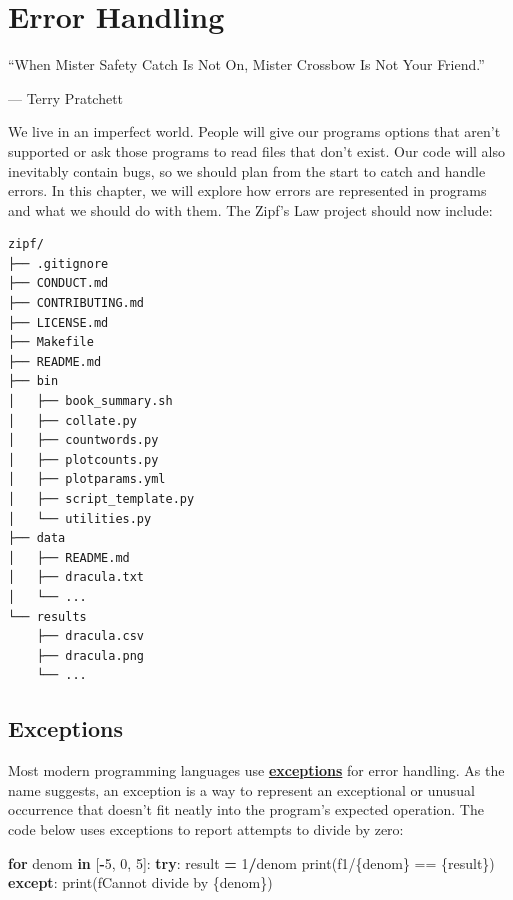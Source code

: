 \documentclass[
]{krantz}
\makeatletter
\newenvironment{Shaded}{\begin{snugshade}}{\end{snugshade}}
\newcommand{\BuiltInTok}[1]{#1}
\newcommand{\ControlFlowTok}[1]{\textcolor[rgb]{0.13,0.29,0.53}{\textbf{#1}}}
\newcommand{\DecValTok}[1]{\textcolor[rgb]{0.00,0.00,0.81}{#1}}
\newcommand{\KeywordTok}[1]{\textcolor[rgb]{0.13,0.29,0.53}{\textbf{#1}}}
\newcommand{\NormalTok}[1]{#1}
\newcommand{\OperatorTok}[1]{\textcolor[rgb]{0.81,0.36,0.00}{\textbf{#1}}}
\newcommand{\SpecialCharTok}[1]{\textcolor[rgb]{0.00,0.00,0.00}{#1}}
\newcommand{\SpecialStringTok}[1]{\textcolor[rgb]{0.31,0.60,0.02}{#1}}
\renewenvironment{quote}{\begin{VF}}{\end{VF}}
\newenvironment{kframe}{%
\medskip{}
\setlength{\fboxsep}{.8em}
 \def\at@end@of@kframe{}%
 \ifinner\ifhmode%
  \def\at@end@of@kframe{\end{minipage}}%
  \begin{minipage}{\columnwidth}%
 \fi\fi%
 \def\FrameCommand##1{\hskip\@totalleftmargin \hskip-\fboxsep
 \colorbox{shadecolor}{##1}\hskip-\fboxsep
     \hskip-\linewidth \hskip-\@totalleftmargin \hskip\columnwidth}%
 \MakeFramed {\advance\hsize-\width
   \@totalleftmargin\z@ \linewidth\hsize
   \@setminipage}}%
 {\par\unskip\endMakeFramed%
 \at@end@of@kframe}
\renewenvironment{Shaded}{\begin{kframe}}{\end{kframe}}
\newcommand{\gref}[2]{\hyperlink{#2}{\textbf{#1}}}
\makeatother
\begin{document}
\hypertarget{errors}{%
\chapter{Error Handling}\label{errors}}

\begin{quote}
``When Mister Safety Catch Is Not On, Mister Crossbow Is Not Your Friend.''

--- Terry Pratchett
\end{quote}

We live in an imperfect world.
People will give our programs options that aren't supported
or ask those programs to read files that don't exist.
Our code will also inevitably contain bugs,
so we should plan from the start to catch and handle errors.
In this chapter,
we will explore how errors are represented in programs
and what we should do with them.
The Zipf's Law project should now include:

\begin{verbatim}
zipf/
├── .gitignore
├── CONDUCT.md
├── CONTRIBUTING.md
├── LICENSE.md
├── Makefile
├── README.md
├── bin
│   ├── book_summary.sh
│   ├── collate.py
│   ├── countwords.py
│   ├── plotcounts.py
│   ├── plotparams.yml
│   ├── script_template.py
│   └── utilities.py
├── data
│   ├── README.md
│   ├── dracula.txt
│   └── ...
└── results
    ├── dracula.csv
    ├── dracula.png
    └── ...
\end{verbatim}

\hypertarget{errors-exceptions}{%
\section{Exceptions}\label{errors-exceptions}}

Most modern programming languages use \gref{exceptions}{exception} for error handling.
As the name suggests,
an exception is a way to represent an exceptional or unusual occurrence
that doesn't fit neatly into the program's expected operation.
The code below uses exceptions to report attempts to divide by zero:

\begin{Shaded}
\begin{Highlighting}[]
\ControlFlowTok{for}\NormalTok{ denom }\KeywordTok{in}\NormalTok{ [}\OperatorTok{{-}}\DecValTok{5}\NormalTok{, }\DecValTok{0}\NormalTok{, }\DecValTok{5}\NormalTok{]:}
    \ControlFlowTok{try}\NormalTok{:}
\NormalTok{        result }\OperatorTok{=} \DecValTok{1}\OperatorTok{/}\NormalTok{denom}
        \BuiltInTok{print}\NormalTok{(}\SpecialStringTok{f\textquotesingle{}1/}\SpecialCharTok{\{}\NormalTok{denom}\SpecialCharTok{\}}\SpecialStringTok{ == }\SpecialCharTok{\{}\NormalTok{result}\SpecialCharTok{\}}\SpecialStringTok{\textquotesingle{}}\NormalTok{)}
    \ControlFlowTok{except}\NormalTok{:}
        \BuiltInTok{print}\NormalTok{(}\SpecialStringTok{f\textquotesingle{}Cannot divide by }\SpecialCharTok{\{}\NormalTok{denom}\SpecialCharTok{\}}\SpecialStringTok{\textquotesingle{}}\NormalTok{)}
\end{Highlighting}
\end{Shaded}
\end{document}
